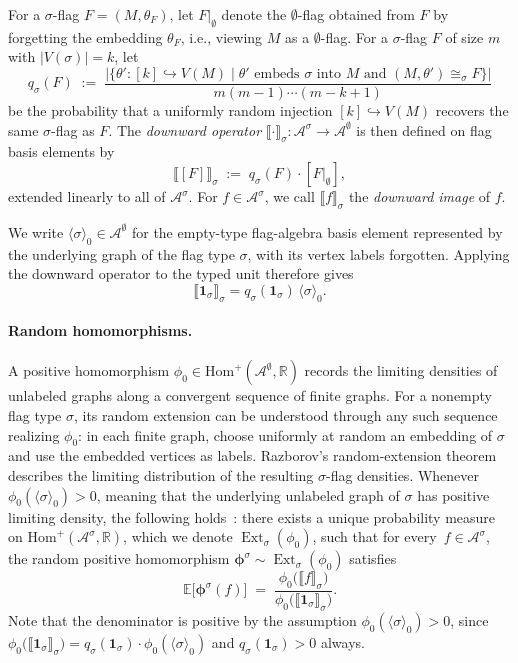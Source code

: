 \documentclass{article}
\newcommand{\poshom}[1]{\mathrm{Hom}^+(\mathcal{A}^{#1}, \mathbb{R})}
\newcommand{\Ext}{\operatorname{Ext}}
\begin{document}
For a $\sigma$-flag $F = (M, \theta_F)$, let $F|_\emptyset$ denote the
$\emptyset$-flag obtained from $F$ by forgetting the embedding $\theta_F$,
i.e., viewing $M$ as a $\emptyset$-flag.
For a $\sigma$-flag $F$ of size $m$ with $|V(\sigma)|=k$, let
\[
  q_\sigma(F)
  \;:=\;
  \frac{
    \bigl|\{\theta' : [k]\hookrightarrow V(M)
       \mid \theta' \text{ embeds }\sigma\text{ into }M
       \text{ and } (M,\theta')\cong_\sigma F\}\bigr|}
       {m(m-1)\cdots(m-k+1)}
\]
be the probability that a uniformly random injection $[k]\hookrightarrow V(M)$
recovers the same $\sigma$-flag as $F$.
The \emph{downward operator}
$\llbracket\cdot\rrbracket_\sigma:\mathcal{A}^\sigma\to\mathcal{A}^\emptyset$
is then defined on flag basis elements by
\[
  \llbracket [F] \rrbracket_\sigma
  \;:=\;
  q_\sigma(F)\cdot [F|_\emptyset],
\]
extended linearly to all of $\mathcal{A}^\sigma$.
For $f\in\mathcal{A}^\sigma$, we call
$\llbracket f\rrbracket_\sigma$ the \emph{downward image} of $f$.

We write $\langle\sigma\rangle_0\in\mathcal{A}^\emptyset$ for the empty-type
flag-algebra basis element represented by the underlying graph of the flag type
$\sigma$, with its vertex labels forgotten.  Applying the downward operator to
the typed unit therefore gives
\[
  \llbracket \mathbf{1}_\sigma \rrbracket_\sigma
  =
  q_\sigma(\mathbf{1}_\sigma)\,\langle\sigma\rangle_0.
\]

\paragraph{Random homomorphisms.}
A positive homomorphism $\phi_0 \in \poshom{\emptyset}$ records the limiting
densities of unlabeled graphs along a convergent sequence of finite graphs.
For a nonempty flag type $\sigma$, its random extension can be understood
through any such sequence realizing $\phi_0$: in each finite graph, choose
uniformly at random an embedding of $\sigma$ and use the embedded vertices as
labels.  Razborov's random-extension theorem describes the limiting
distribution of the resulting $\sigma$-flag densities.
Whenever $\phi_0(\langle\sigma\rangle_0) > 0$, meaning that the underlying
unlabeled graph of $\sigma$ has positive limiting density, the following
holds~\cite{razborov2007flag}:
there exists a unique probability measure on $\poshom{\sigma}$,
which we denote $\Ext_\sigma(\phi_0)$,
such that for every~$f \in \mathcal{A}^\sigma$, the random positive
homomorphism $\boldsymbol{\phi}^\sigma \sim \Ext_\sigma(\phi_0)$ satisfies
\begin{equation}\label{eq:ensemble}
  \mathbb{E}\bigl[\boldsymbol{\phi}^\sigma(f)\bigr]
  \;=\;
  \frac{\phi_0\bigl(\llbracket f \rrbracket_\sigma\bigr)}
       {\phi_0\bigl(\llbracket \mathbf{1}_\sigma \rrbracket_\sigma\bigr)}.
\end{equation}
Note that the denominator is positive by the assumption
$\phi_0(\langle\sigma\rangle_0)>0$, since
$\phi_0\bigl(\llbracket \mathbf{1}_\sigma \rrbracket_\sigma\bigr)
=q_\sigma(\mathbf{1}_\sigma)\cdot
\phi_0(\langle\sigma\rangle_0)$ and $q_\sigma(\mathbf{1}_\sigma)>0$ always.
\end{document}
